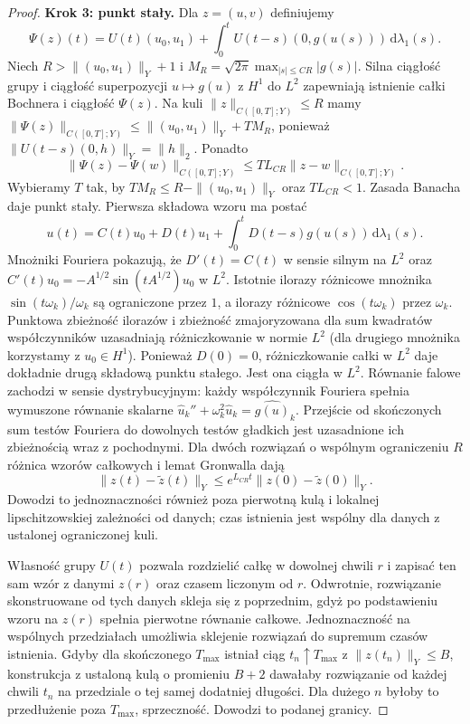 \begin{proof}
\textbf{Krok 3: punkt stały.} Dla $z=(u,v)$ definiujemy
\[
 \Psi(z)(t)=U(t)(u_0,u_1)
 +\int_0^tU(t-s)(0,g(u(s)))\,\mathrm d\lambda_1(s).
\]
Niech $R>\|(u_0,u_1)\|_Y+1$ i
$M_R=\sqrt{2\pi}\max_{|s|\le CR}|g(s)|$.
Silna ciągłość grupy i ciągłość superpozycji
$u\mapsto g(u)$ z $H^1$ do $L^2$ zapewniają
istnienie całki Bochnera i ciągłość $\Psi(z)$.
Na kuli $\|z\|_{C([0,T];Y)}\le R$ mamy
$\|\Psi(z)\|_{C([0,T];Y)}\le\|(u_0,u_1)\|_Y+TM_R$,
ponieważ $\|U(t-s)(0,h)\|_Y=\|h\|_2$.
Ponadto
\[
 \|\Psi(z)-\Psi(w)\|_{C([0,T];Y)}
 \le TL_{CR}\|z-w\|_{C([0,T];Y)}.
\]
Wybieramy $T$ tak, by $TM_R\le R-\|(u_0,u_1)\|_Y$
oraz $TL_{CR}<1$. Zasada Banacha daje punkt stały.
Pierwsza składowa wzoru ma postać
\[
 u(t)=C(t)u_0+D(t)u_1+
 \int_0^tD(t-s)g(u(s))\,\mathrm d\lambda_1(s).
\]
Mnożniki Fouriera pokazują, że
$D'(t)=C(t)$ w sensie silnym na $L^2$
oraz $C'(t)u_0=-A^{1/2}\sin(tA^{1/2})u_0$ w $L^2$.
Istotnie ilorazy różnicowe mnożnika
$\sin(t\omega_k)/\omega_k$ są ograniczone przez $1$,
a ilorazy różnicowe $\cos(t\omega_k)$ przez $\omega_k$.
Punktowa zbieżność ilorazów i zbieżność zmajoryzowana
dla sum kwadratów współczynników uzasadniają
różniczkowanie w normie $L^2$ (dla drugiego mnożnika
korzystamy z $u_0\in H^1$).
Ponieważ $D(0)=0$, różniczkowanie całki w $L^2$
daje dokładnie drugą składową punktu stałego.
Jest ona ciągła w $L^2$. Równanie falowe zachodzi
w sensie dystrybucyjnym: każdy współczynnik Fouriera
spełnia wymuszone równanie skalarne
$\widehat u_k''+\omega_k^2\widehat u_k=\widehat{g(u)}_k$.
Przejście od skończonych sum testów Fouriera do
dowolnych testów gładkich jest uzasadnione ich
zbieżnością wraz z pochodnymi.
Dla dwóch rozwiązań o wspólnym ograniczeniu $R$
różnica wzorów całkowych i lemat Gronwalla dają
\[
 \|z(t)-\widetilde z(t)\|_Y
 \le e^{L_{CR}t}\|z(0)-\widetilde z(0)\|_Y .
\]
Dowodzi to jednoznaczności również poza pierwotną
kulą i lokalnej lipschitzowskiej zależności od danych;
czas istnienia jest wspólny dla danych z ustalonej
ograniczonej kuli.

Własność grupy $U(t)$ pozwala rozdzielić całkę
w dowolnej chwili $r$ i zapisać ten sam wzór
z danymi $z(r)$ oraz czasem liczonym od $r$.
Odwrotnie, rozwiązanie skonstruowane od tych danych
skleja się z poprzednim, gdyż po podstawieniu
wzoru na $z(r)$ spełnia pierwotne równanie całkowe.
Jednoznaczność na wspólnych przedziałach umożliwia
sklejenie rozwiązań do supremum czasów istnienia.
Gdyby dla skończonego $T_{\max}$ istniał ciąg
$t_n\uparrow T_{\max}$ z $\|z(t_n)\|_Y\le B$,
konstrukcja z ustaloną kulą o promieniu $B+2$
dawałaby rozwiązanie od każdej chwili $t_n$
na przedziale o tej samej dodatniej długości.
Dla dużego $n$ byłoby to przedłużenie poza
$T_{\max}$, sprzeczność. Dowodzi to podanej granicy.
\end{proof}


